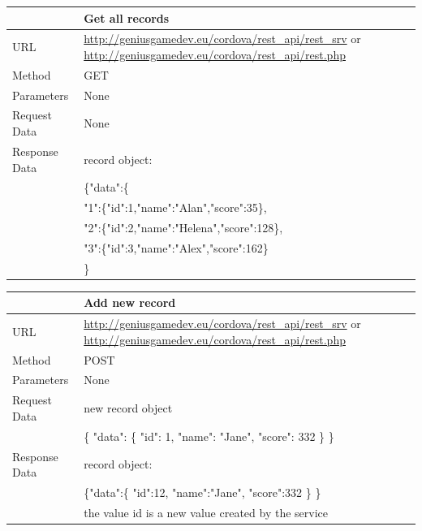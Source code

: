 \begin{tabularx}{\textwidth}{|l|X|}
\hline
&\textbf{Get all records}\\\hline
URL &   \url{http://geniusgamedev.eu/cordova/rest_api/rest_srv} or \url{http://geniusgamedev.eu/cordova/rest_api/rest.php}\\\hline
Method  & GET\\\hline
Parameters  & None \\\hline
Request Data & None\\\hline
Response Data & record object:\\
&
\{"data":\{\\
&"1":\{"id":1,"name":"Alan","score":35\},\\
&"2":\{"id":2,"name":"Helena","score":128\},\\
&"3":\{"id":3,"name":"Alex","score":162\}\\
&\}
\\\hline
\end{tabularx}

\begin{tabularx}{\textwidth}{|l|X|}
\hline
&\textbf{Add new record}\\\hline
URL &   \url{http://geniusgamedev.eu/cordova/rest_api/rest_srv} or \url{http://geniusgamedev.eu/cordova/rest_api/rest.php}\\\hline
Method  & POST\\\hline
Parameters  & None \\\hline
Request Data & new record object\\
&\{
"data": \{
"id": 1,
"name": "Jane",
"score": 332
\}
\}
\\\hline
Response Data & record object:\\
&
\{"data":\{
    "id":12,
    "name":"Jane",
    "score":332
    \}
\}
\\
&the value id is a new value created by the service
\\\hline
\end{tabularx}


